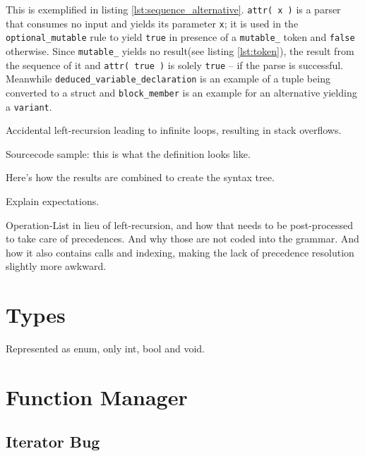 		This is exemplified in listing \ref{lst:sequence_alternative}. \lstinline$attr( x )$ is a parser that consumes no input and yields its parameter \lstinline$x$; it is used in the \lstinline$optional_mutable$ rule to yield \lstinline$true$ in presence of a \lstinline$mutable_$ token and \lstinline$false$ otherwise. Since \lstinline$mutable_$ yields no result(see listing \ref{lst:token}), the result from the sequence of it and \lstinline$attr( true )$ is solely \lstinline$true$ -- if the parse is successful. Meanwhile \lstinline$deduced_variable_declaration$ is an example of a tuple being converted to a struct and \lstinline$block_member$ is an example for an alternative yielding a \lstinline$variant$.
		
		
		Accidental left-recursion leading to infinite loops, resulting in stack overflows.
	
		Sourcecode sample: this is what the definition looks like.
		
		Here's how the results are combined to create the syntax tree.
		
		Explain expectations.
		
		Operation-List in lieu of left-recursion, and how that needs to be post-processed to take care of precedences. And why those are not coded into the grammar. And how it also contains calls and indexing, making the lack of precedence resolution slightly more awkward.
	
	\section{Types}
	
		Represented as enum, only int, bool and void.
	
	\section{Function Manager}
	
		
		\subsection{Iterator Bug}
		
